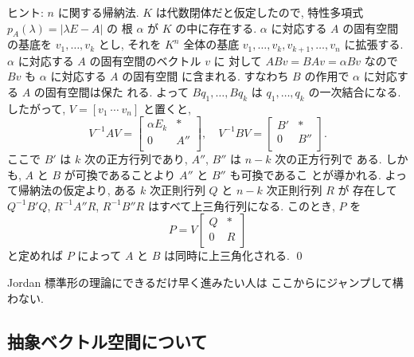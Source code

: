 \documentclass[12pt,twoside]{jarticle}
\begin{document}
\noindent
ヒント: $n$ に関する帰納法. 
$K$ は代数閉体だと仮定したので, 特性多項式 $p_A(\lambda)=|\lambda E - A|$ の
根 $\alpha$ が $K$ の中に存在する.  
$\alpha$ に対応する $A$ の固有空間の基底を $v_1,\dots,v_k$ とし,
それを $K^n$ 全体の基底 $v_1,\dots,v_k,v_{k+1},\dots,v_n$ に拡張する.
$\alpha$ に対応する $A$ の固有空間のベクトル $v$ に
対して $ABv=BAv=\alpha Bv$ なので $Bv$ も $\alpha$ に対応する $A$ の固有空間
に含まれる.  すなわち $B$ の作用で $\alpha$ に対応する $A$ の固有空間は保た
れる.  よって $Bq_1,\dots,Bq_k$ は $q_1,\dots,q_k$ の一次結合になる. 
したがって, $V=[v_1\ \cdots\ v_n]$ と置くと,
\begin{equation*}
  V^{-1}AV=
  \begin{bmatrix}
    \alpha E_k & *   \\
      0        & A'' \\
  \end{bmatrix},
  \quad
  V^{-1}BV=
  \begin{bmatrix}
    B' & *   \\
    0  & B'' \\
  \end{bmatrix}.
\end{equation*}
ここで $B'$ は $k$ 次の正方行列であり, $A''$, $B''$ は $n-k$ 次の正方行列で
ある.  しかも, $A$ と $B$ が可換であることより $A''$ と $B''$ も可換であるこ
とが導かれる.  よって帰納法の仮定より, 
ある $k$ 次正則行列 $Q$ と $n-k$ 次正則行列 $R$ が
存在して $Q^{-1}B'Q$, $R^{-1}A''R$, $R^{-1}B''R$ はすべて上三角行列になる.
このとき, $P$ を
\begin{equation*}
  P = V
  \begin{bmatrix}
    Q & * \\
    0 & R \\
  \end{bmatrix}
\end{equation*}
と定めれば $P$ によって $A$ と $B$ は同時に上三角化される.
\qed

\bigskip

Jordan 標準形の理論にできるだけ早く進みたい人は
ここからにジャンプして構わない.


\subsection{抽象ベクトル空間について}
\label{sec:abstract-vector-space}
\end{document}
